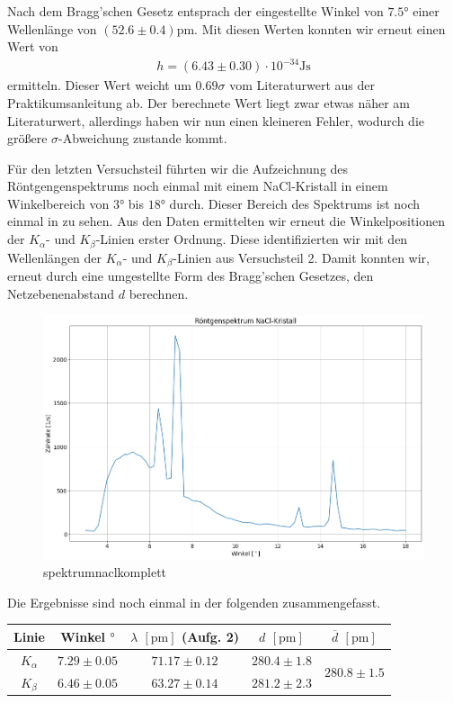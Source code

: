 Nach dem Bragg'schen Gesetz entsprach der eingestellte Winkel von $7.5\si{\degree}$ einer Wellenlänge von $(52.6 \pm 0.4)\si{\pico\meter}$. Mit diesen Werten konnten wir erneut einen Wert von
\begin{align}
  h = (6.43 \pm 0.30) \cdot 10^{-34} \si{\joule\second}
\end{align}
ermitteln. Dieser Wert weicht um $0.69\sigma$ vom Literaturwert aus der Praktikumsanleitung ab. Der berechnete Wert liegt zwar etwas näher am Literaturwert, allerdings haben wir nun einen kleineren Fehler, wodurch die größere $\sigma$-Abweichung zustande kommt.

Für den letzten Versuchsteil führten wir die Aufzeichnung des Röntgengenspektrums noch einmal mit einem NaCl-Kristall in einem Winkelbereich von $3\si{\degree}$ bis $18\si{\degree}$ durch. Dieser Bereich des Spektrums ist noch einmal in  zu sehen. Aus den Daten ermittelten wir erneut die Winkelpositionen der $K_{\alpha}$- und $K_{\beta}$-Linien erster Ordnung. Diese identifizierten wir mit den Wellenlängen der $K_{\alpha}$- und $K_{\beta}$-Linien aus Versuchsteil 2. Damit konnten wir, erneut durch eine umgestellte Form des Bragg'schen Gesetzes, den Netzebenenabstand $d$ berechnen.

\begin{figure}[H]
  \centering
  \includegraphics[width=.9\textwidth]{files/plots/spektrum_nacl_komplett.png}
  \caption{spektrumnaclkomplett}
  \label{fig:spektrum_nacl_komplett_zsmf}
\end{figure}

Die Ergebnisse sind noch einmal in der folgenden  zusammengefasst.

\begin{table}[H]
  \centering
  \begin{tabular}{c|c|c|c|c}
    Linie & Winkel $\si{\degree}$ & $\lambda$ $[\si{\pico\meter}]$ (Aufg. 2) & $d$ $[\si{\pico\meter}]$ & $\overline{d}$ $[\si{\pico\meter}]$\\\hline
    $K_{\alpha}$ & $7.29 \pm 0.05$ & $71.17 \pm 0.12$ & $280.4 \pm 1.8$ & \multirow{2}{*}{$280.8 \pm 1.5$}\\
    $K_{\beta}$ & $6.46 \pm 0.05$ & $63.27 \pm 0.14$ & $281.2 \pm 2.3$ &
  \end{tabular}
  \label{tab:d_calc_zsmf}
\end{table}

